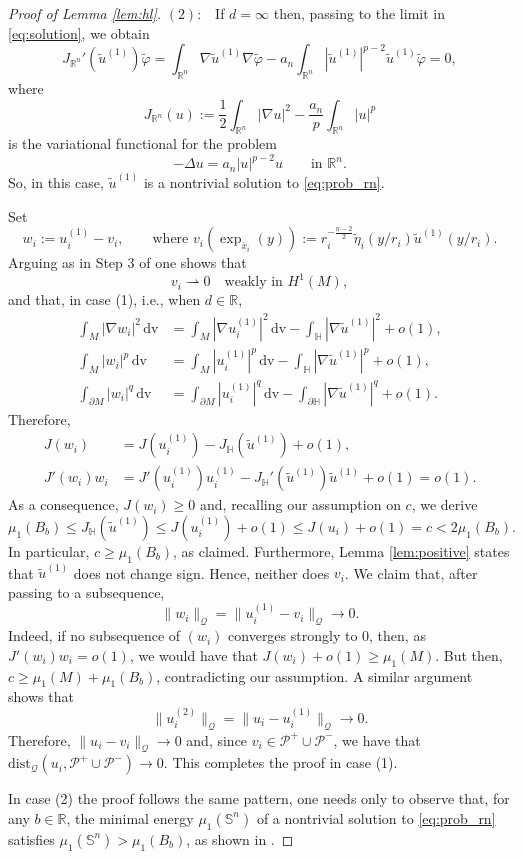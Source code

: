 \documentclass[reqno,11pt,oneside]{amsart}
\numberwithin{equation}{section}
\def\r{\mathbb{R}}
\def\rn{\mathbb{R}^n}
\def\sn{\mathbb{S}^n}
\def\rh{\rightharpoonup}
\def\im{\int_{M}}
\def\idm{\int_{\partial M}}
\def\irn{\int_{\rn}}
\def\vp{\varphi}
\def\cP{\mathcal{P}}
\def\tilde{\widetilde}
\def\dv{\,\mathrm{dv}}
\def\dist{\mathrm{dist}}
\begin{document}
\begin{proof}[Proof of Lemma \ref{lem:hl}]
$(2):$ \ If $d=\infty$ then, passing to the limit in \eqref{eq:solution}, we obtain
$$J_{\rn}'(\tilde{u}^{(1)})\tilde{\vp}=\irn\nabla\tilde{u}^{(1)}\nabla\tilde{\vp}-a_n\irn|\tilde{u}^{(1)}|^{p-2}\tilde{u}^{(1)}\tilde{\vp}=0,$$
where
$$J_{\rn}(u):=\frac{1}{2}\irn|\nabla u|^2-\frac{a_n}{p}\irn|u|^p$$ is the variational functional for the problem
\begin{equation}\label{eq:prob_rn}
-\Delta u=a_n|u|^{p-2}u\qquad\text{in \ }\rn.
\end{equation}
So, in this case, $\tilde{u}^{(1)}$ is a nontrivial solution to \eqref{eq:prob_rn}. 

Set
$$w_i:=u_i^{(1)}-v_i,\qquad\text{where \ \ }v_i(\exp_{\bar{x}_i}(y)):=r_i^{-\frac{n-2}{2}}\tilde{\eta}_i(y/r_i)\tilde{u}^{(1)}(y/r_i).$$
Arguing as in Step 3 of \cite[Proof of Lemma 3.2]{dhr} one shows that
$$v_i\rh 0\quad\text{weakly in \ }H^1(M),$$
and that, in case (1), i.e., when $d\in\r$,
\begin{align*}
\im|\nabla w_i|^2\dv&=\im|\nabla u_i^{(1)}|^2\dv-\int_{\mathbb{H}}|\nabla\tilde{u}^{(1)}|^2+o(1), \nonumber\\
\im|w_i|^p\dv&=\im|u_i^{(1)}|^p\dv-\int_{\mathbb{H}}|\nabla\tilde{u}^{(1)}|^p+o(1), \nonumber\\
\idm|w_i|^q\dv&=\idm|u_i^{(1)}|^q\dv-\int_{\partial\mathbb{H}}|\nabla\tilde{u}^{(1)}|^q+o(1).
\end{align*}
Therefore,
\begin{align*}
J(w_i)&=J(u_i^{(1)})-J_\mathbb{H}(\tilde{u}^{(1)})+o(1),\nonumber \\
J'(w_i)w_i&=J'(u_i^{(1)})u_i^{(1)}-J_\mathbb{H}'(\tilde{u}^{(1)})\tilde{u}^{(1)}+o(1)=o(1).
\end{align*} 
As a consequence, $J(w_i)\geq 0$ and, recalling our assumption on $c$, we derive
$$\mu_1(B_b)\leq J_\mathbb{H}(\tilde{u}^{(1)})\leq J(u_i^{(1)})+o(1)\leq J(u_i)+o(1)=c<2\mu_1(B_b).$$
In particular, $c\geq\mu_1(B_b)$, as claimed. Furthermore, Lemma \ref{lem:positive} states that $\tilde{u}^{(1)}$ does not change sign. Hence, neither does $v_i$. We claim that, after passing to a subsequence,
\begin{equation*}
\|w_i\|_\mathscr{Q}=\|u_i^{(1)}-v_i\|_\mathscr{Q}\to 0.
\end{equation*}
Indeed, if no subsequence of $(w_i)$ converges strongly to $0$, then, as $J'(w_i)w_i=o(1)$, we would have that $J(w_i)+o(1)\geq \mu_1(M)$. But then, $c\geq\mu_1(M)+\mu_1(B_b)$, contradicting our assumption. A similar argument shows that
\begin{equation*}
\|u_i^{(2)}\|_\mathscr{Q}=\|u_i-u_i^{(1)}\|_\mathscr{Q}\to 0.
\end{equation*}
Therefore, $\|u_i-v_i\|_\mathscr{Q}\to 0$ and, since $v_i\in\cP^+\cup\cP^-$, we have that $\dist_\mathscr{Q}(u_i,\cP^+\cup\cP^-)\to 0$. This completes the proof in case (1).

In case (2) the proof follows the same pattern, one needs only to observe that, for any $b\in\r$, the minimal energy $\mu_1(\sn)$ of a nontrivial solution to \eqref{eq:prob_rn} satisfies $\mu_1(\sn)>\mu_1(B_b)$, as shown in \cite[Lemma A.1]{hl}. 
\end{proof}





\end{document}
